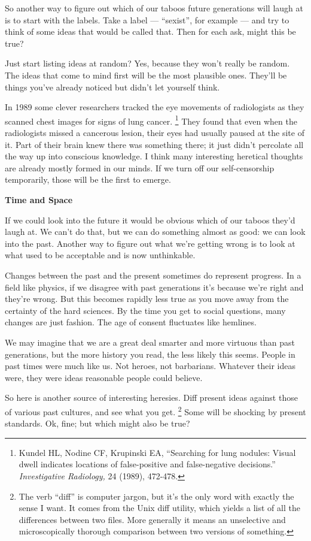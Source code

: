 So another way to figure out which of our taboos future generations will
laugh at is to start with the labels. Take a label --- ``sexist'', for
example --- and try to think of some ideas that would be called that.
Then for each ask, might this be true?

Just start listing ideas at random? Yes, because they won't really be
random. The ideas that come to mind first will be the most plausible
ones. They'll be things you've already noticed but didn't let yourself
think.

In 1989 some clever researchers tracked the eye movements of
radiologists as they scanned chest images for signs of lung cancer.
\footnote{Kundel HL, Nodine CF, Krupinski EA, ``Searching for lung
nodules: Visual dwell indicates locations of false-positive and
false-negative decisions.'' \emph{Investigative Radiology,} 24 (1989),
472-478.} They found that even when the radiologists missed a cancerous
lesion, their eyes had usually paused at the site of it. Part of their
brain knew there was something there; it just didn't percolate all the
way up into conscious knowledge. I think many interesting heretical
thoughts are already mostly formed in our minds. If we turn off our
self-censorship temporarily, those will be the first to emerge.

\textbf{Time and Space}

If we could look into the future it would be obvious which of our taboos
they'd laugh at. We can't do that, but we can do something almost as
good: we can look into the past. Another way to figure out what we're
getting wrong is to look at what used to be acceptable and is now
unthinkable.

Changes between the past and the present sometimes do represent
progress. In a field like physics, if we disagree with past generations
it's because we're right and they're wrong. But this becomes rapidly
less true as you move away from the certainty of the hard sciences. By
the time you get to social questions, many changes are just fashion. The
age of consent fluctuates like hemlines.

We may imagine that we are a great deal smarter and more virtuous than
past generations, but the more history you read, the less likely this
seems. People in past times were much like us. Not heroes, not
barbarians. Whatever their ideas were, they were ideas reasonable people
could believe.

So here is another source of interesting heresies. Diff present ideas
against those of various past cultures, and see what you get. \footnote{The verb ``diff'' is computer jargon, but it's the only word
with exactly the sense I want. It comes from the Unix diff utility,
which yields a list of all the differences between two files. More
generally it means an unselective and microscopically thorough
comparison between two versions of something.}
Some will be shocking by present standards. Ok, fine; but which might
also be true?

